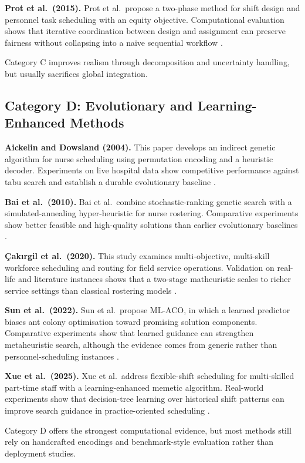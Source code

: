 \documentclass[12pt]{article}
\begin{document}
\textbf{Prot et al.\ (2015).} Prot et al.\ propose a two-phase method for shift design and personnel task scheduling with an equity objective. Computational evaluation shows that iterative coordination between design and assignment can preserve fairness without collapsing into a naive sequential workflow \cite{prot2015}.

Category C improves realism through decomposition and uncertainty handling, but usually sacrifices global integration.

\subsection{Category D: Evolutionary and Learning-Enhanced Methods}

\textbf{Aickelin and Dowsland (2004).} This paper develops an indirect genetic algorithm for nurse scheduling using permutation encoding and a heuristic decoder. Experiments on live hospital data show competitive performance against tabu search and establish a durable evolutionary baseline \cite{aickelin2004}.

\textbf{Bai et al.\ (2010).} Bai et al.\ combine stochastic-ranking genetic search with a simulated-annealing hyper-heuristic for nurse rostering. Comparative experiments show better feasible and high-quality solutions than earlier evolutionary baselines \cite{bai2010}.

\textbf{\c{C}ak{\i}rgil et al.\ (2020).} This study examines multi-objective, multi-skill workforce scheduling and routing for field service operations. Validation on real-life and literature instances shows that a two-stage matheuristic scales to richer service settings than classical rostering models \cite{cakirgil2020}.

\textbf{Sun et al.\ (2022).} Sun et al.\ propose ML-ACO, in which a learned predictor biases ant colony optimisation toward promising solution components. Comparative experiments show that learned guidance can strengthen metaheuristic search, although the evidence comes from generic rather than personnel-scheduling instances \cite{sun2022}.

\textbf{Xue et al.\ (2025).} Xue et al.\ address flexible-shift scheduling for multi-skilled part-time staff with a learning-enhanced memetic algorithm. Real-world experiments show that decision-tree learning over historical shift patterns can improve search guidance in practice-oriented scheduling \cite{xue2025}.

Category D offers the strongest computational evidence, but most methods still rely on handcrafted encodings and benchmark-style evaluation rather than deployment studies.
\end{document}
